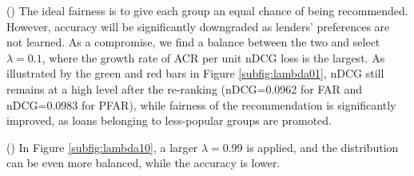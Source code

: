() The ideal fairness is to give each group an equal chance of being recommended. However, accuracy will be significantly downgraded as lenders' preferences are not learned. As a compromise, we find a balance between the two and select $\lambda=0.1$, where the growth rate of ACR per unit nDCG loss is the largest. As illustrated by the green and red bars in Figure \ref{subfig:lambda01}, nDCG still remains at a high level after the re-ranking (nDCG=0.0962 for FAR and nDCG=0.0983 for PFAR), while fairness of the recommendation is significantly improved, as loans belonging to less-popular groups are promoted.

() In Figure \ref{subfig:lambda10}, a larger $\lambda=0.99$ is applied, and the distribution can be even more balanced, while the accuracy is lower.





